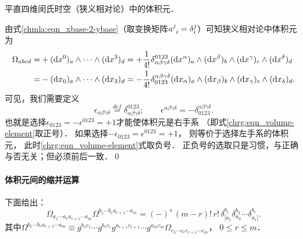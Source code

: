 \begin{example}\label{chrg:exam_RV}
	平直四维闵氏时空（狭义相对论）中的体积元．
\end{example}
由式\eqref{chmla:eqn_xbase-2-ybase}（取变换矩阵$a^{j}_{\hphantom{j}i}=\delta^j_i$）可知狭义相对论中体积元为
\begin{align*}
	\Omega_{abcd}=&+ ({\rm d}x^0)_{a} \wedge\cdots \wedge({\rm d}x^3)_{d} 
	=+\frac{1}{4!}\delta_{\alpha\beta\gamma\delta}^{0123}  ({\rm d}x^{\alpha})_{a} \wedge 
	({\rm d}x^{\beta})_{b} \wedge ({\rm d}x^{\gamma})_{c} \wedge({\rm d}x^{\delta})_{d} \\
	=& -({\rm d}x_0)_{a} \wedge \cdots \wedge({\rm d}x_3)_{d} 
	=-\frac{1}{4!}\delta^{\alpha\beta\gamma\delta}_{0123}  ({\rm d}x_{\alpha})_{a} \wedge 
	({\rm d}x_{\beta})_{b} \wedge ({\rm d}x_{\gamma})_{c} \wedge({\rm d}x_{\delta})_{d}.
\end{align*}
可见，我们需要定义
\begin{equation}\label{chrg:eqn_RV}
	\epsilon_{\alpha\beta\gamma\delta} \overset{def}{=} \delta_{\alpha\beta\gamma\delta}^{0123}; \qquad
	\epsilon^{\alpha\beta\gamma\delta} =- \delta^{\alpha\beta\gamma\delta}_{0123}.
\end{equation}
也就是选择$\epsilon_{0123} = -\epsilon^{0123} = +1$才能使体积元是右手系
（即式\eqref{chrg:eqn_volume-element}取正号）． 
如果选择$-\epsilon_{0123} = \epsilon^{0123} = +1$，
则等价于选择左手系的体积元，
此时\eqref{chrg:eqn_volume-element}式取负号．
正负号的选取只是习惯，与正确与否无关；但必须前后一致．\qed


\paragraph{体积元间的缩并运算} 
下面给出：
\begin{equation}\label{chrg:eqn_VE-contract-VE}
    \boxed{
    \Omega_{a_1 \cdots a_r a_{r+1} \cdots a_m}\Omega^{{b_1 \cdots b_r} a_{r+1} \cdots a_m}
    = (-)^s \, (m-r)! \, r! \, \delta_{\lbrack a_1}^{b_1} \delta_{a_2}^{b_2}\cdots 
    \delta_{a_r \rbrack}^{b_r}   .  }
\end{equation}
其中$\Omega^{{b_1 \cdots b_r} a_{r+1} \cdots a_m}\equiv g^{b_{1}c_{1}} \cdots g^{b_{r}c_{r}}
g^{a_{r+1}c_{r+1}} \cdots g^{a_{m}c_{m}}\Omega_{c_1 \cdots c_r c_{r+1} \cdots c_m}$，
$0\leqslant r \leqslant m$．


